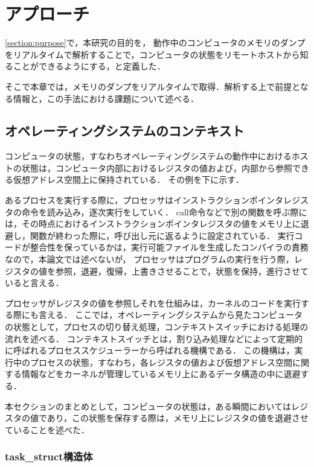 \chapter{アプローチ}
\label{chap:approach}

\ref{section:purpose}で，本研究の目的を，
動作中のコンピュータのメモリのダンプをリアルタイムで解析することで，コンピュータの状態をリモートホストから知ることができるようにする，と定義した．

そこで本章では，メモリのダンプをリアルタイムで取得．解析する上で前提となる情報と，この手法における課題について述べる．

\section{オペレーティングシステムのコンテキスト}
\label{section:context}

コンピュータの状態，すなわちオペレーティングシステムの動作中におけるホストの状態は，コンピュータ内部におけるレジスタの値および，内部から参照できる仮想アドレス空間上に保持されている．
その例を下に示す．

あるプロセスを実行する際に，プロセッサはインストラクションポインタレジスタの命令を読み込み，逐次実行をしていく．
call命令などで別の関数を呼ぶ際には，その時点におけるインストラクションポインタレジスタの値をメモリ上に退避し，関数が終わった際に，呼び出し元に返るように設定されている．
実行コードが整合性を保っているかは，実行可能ファイルを生成したコンパイラの責務なので，本論文では述べないが，
プロセッサはプログラムの実行を行う際，レジスタの値を参照，退避，復帰，上書きさせることで，状態を保持，進行させていると言える．

プロセッサがレジスタの値を参照しそれを仕組みは，カーネルのコードを実行する際にも言える．
ここでは，オペレーティングシステムから見たコンピュータの状態として，プロセスの切り替え処理，コンテキストスイッチにおける処理の流れを述べる．
コンテキストスイッチとは，割り込み処理などによって定期的に呼ばれるプロセススケジューラーから呼ばれる機構である．
この機構は，実行中のプロセスの状態，すなわち，各レジスタの値および仮想アドレス空間に関する情報などをカーネルが管理しているメモリ上にあるデータ構造の中に退避する．

本セクションのまとめとして，コンピュータの状態は，ある瞬間においてはレジスタの値であり，この状態を保存する際は，メモリ上にレジスタの値を退避させていることを述べた．

\subsection{task\_struct構造体}

